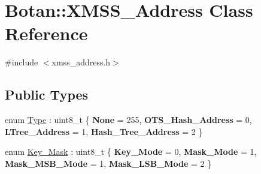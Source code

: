 \hypertarget{class_botan_1_1_x_m_s_s___address}{}\section{Botan\+:\+:X\+M\+S\+S\+\_\+\+Address Class Reference}
\label{class_botan_1_1_x_m_s_s___address}


{\ttfamily \#include $<$xmss\+\_\+address.\+h$>$}

\subsection*{Public Types}
\begin{DoxyCompactItemize}
\item 
enum \mbox{\hyperlink{class_botan_1_1_x_m_s_s___address_a0101e45c5608cf312b497bf6d855000e}{Type}} \+: uint8\+\_\+t \{ {\bfseries None} = 255, 
{\bfseries O\+T\+S\+\_\+\+Hash\+\_\+\+Address} = 0, 
{\bfseries L\+Tree\+\_\+\+Address} = 1, 
{\bfseries Hash\+\_\+\+Tree\+\_\+\+Address} = 2
 \}
\item 
enum \mbox{\hyperlink{class_botan_1_1_x_m_s_s___address_a85146c0c3e049f62c413194049f501e3}{Key\+\_\+\+Mask}} \+: uint8\+\_\+t \{ {\bfseries Key\+\_\+\+Mode} = 0, 
{\bfseries Mask\+\_\+\+Mode} = 1, 
{\bfseries Mask\+\_\+\+M\+S\+B\+\_\+\+Mode} = 1, 
{\bfseries Mask\+\_\+\+L\+S\+B\+\_\+\+Mode} = 2
 \}
\end{DoxyCompactItemize}
